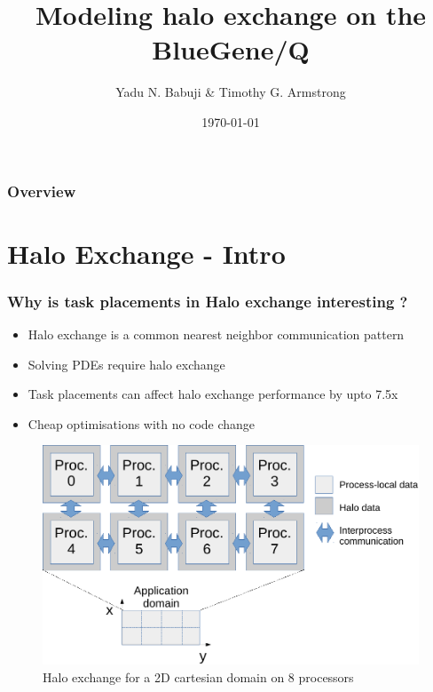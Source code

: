 \documentclass{beamer}
\title[Halo exchange on BG/Q]{Modeling halo exchange on the BlueGene/Q} %
\author{Yadu N. Babuji \& Timothy G. Armstrong} %
\institute[Dept. of Computer Science]
{
The University of Chicago \\
\medskip
}
\date{\today} %
\begin{document}
\begin{frame}
\titlepage %
\end{frame}

\begin{frame}
\frametitle{Overview} %
\tableofcontents %
\end{frame}


\section{Halo Exchange - Intro} %
\begin{frame}
\frametitle{Why is task placements in Halo exchange interesting ?}
\begin{itemize}
\item Halo exchange is a common nearest neighbor communication pattern
\item Solving PDEs require halo exchange
\item Task placements can affect halo exchange performance by upto 7.5x
\item Cheap optimisations with no code change
\end{itemize}
\begin{figure}
\centering
\caption{Halo exchange for a 2D cartesian domain on 8 processors}
\includegraphics[width=0.55\linewidth]{../fig/halo-illustration}
\end{figure}
\end{frame}
\end{document}
